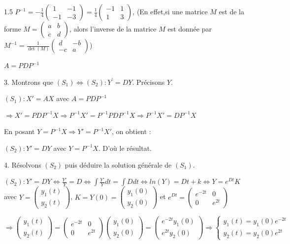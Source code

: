 \documentclass[12pt]{article}
\begin{document}
\begin{spacing}{1.5}
$ P ^{-1}=-\frac{1}{4}\begin{pmatrix}
1 & -1\\
-1 & -3
\end{pmatrix}=\frac{1}{4}\begin{pmatrix}
-1 & 1\\
1 & 3
\end{pmatrix}$, (En effet,si une matrice $M$ est de la forme $M=\begin{pmatrix}
a & b\\
c & d
\end{pmatrix}$, alors l'inverse de la matrice $M$ est donnée par $M^{-1}=\frac{1}{\det(M)}\begin{pmatrix}
d & -b\\
-c & a
\end{pmatrix}$)



$A=PDP^{-1}$

3. Montrons que $(S_1)\Longleftrightarrow(S_2):Y^{\prime} = DY$. Précisons $Y$.

$(S_1): X'=AX$ avec $A=PDP^{-1}$

$\Rightarrow X'=PDP^{-1}X\Rightarrow P^{-1}X'=P^{-1}PDP^{-1}X\Rightarrow P^{-1}X'=DP^{-1}X$

En posant $Y=P^{-1}X\Rightarrow Y'=P^{-1}X'$, on obtient :

$(S_2):Y'=DY$ avec $Y=P^{-1}X$. D'où le résultat.

4. Résolvons $(S_2)$ puis déduire la solution générale de $(S_1)$.

$(S_2):Y'=DY\Leftrightarrow \frac{Y'}{Y}=D \Leftrightarrow \int\frac{Y'}{Y}dt=\int Ddt\Leftrightarrow ln(Y)=Dt+k\Leftrightarrow Y=e^{Dt}K$ avec $Y=\begin{pmatrix}
y_1(t)\\
y_2(t)
\end{pmatrix}$, $K=Y(0)=\begin{pmatrix}
y_1(0)\\
y_2(0)
\end{pmatrix}$ et $e^{Dt}=\begin{pmatrix}
e^{-2t} & 0\\
0 & e^{2t}
\end{pmatrix}$

$\Rightarrow \begin{pmatrix}
y_1(t)\\
y_2(t)
\end{pmatrix}=\begin{pmatrix}
e^{-2t} & 0\\
0 & e^{2t}
\end{pmatrix}\begin{pmatrix}
y_1(0)\\
y_2(0)
\end{pmatrix}=\begin{pmatrix}
e^{-2t}y_1(0)\\
e^{2t}y_2(0)
\end{pmatrix}\Rightarrow \begin{cases}
y_1(t)=y_1(0)e^{-2t}\\ 
y_2(t)=y_2(0)e^{2t}  
\end{cases}$


\end{spacing}
\end{document}
